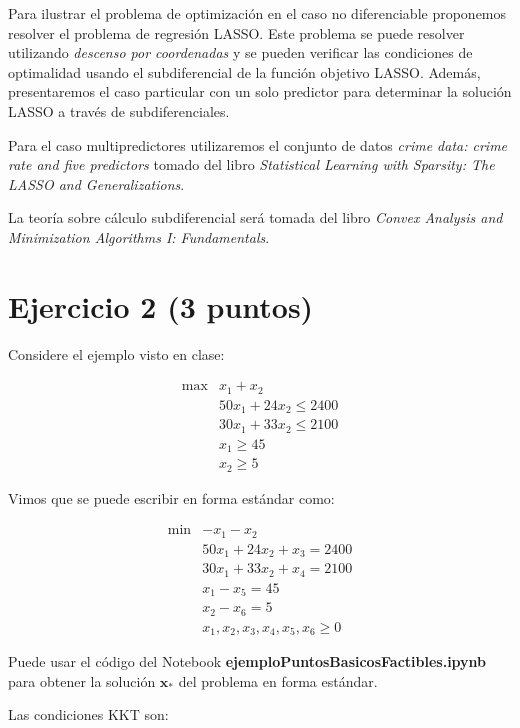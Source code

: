 \documentclass[11pt]{article}
\begin{document}
Para ilustrar el problema de optimización en el caso no diferenciable
proponemos resolver el problema de regresión LASSO. Este problema se
puede resolver utilizando \emph{descenso por coordenadas} y se pueden
verificar las condiciones de optimalidad usando el subdiferencial de la
función objetivo LASSO. Además, presentaremos el caso particular con un
solo predictor para determinar la solución LASSO a través de
subdiferenciales.

Para el caso multipredictores utilizaremos el conjunto de datos
\emph{crime data: crime rate and five predictors} tomado del libro
\emph{Statistical Learning with Sparsity: The LASSO and
Generalizations}.

La teoría sobre cálculo subdiferencial será tomada del libro
\emph{Convex Analysis and Minimization Algorithms I: Fundamentals}.

    \hypertarget{ejercicio-2-3-puntos}{%
\section{Ejercicio 2 (3 puntos)}\label{ejercicio-2-3-puntos}}

Considere el ejemplo visto en clase:

\[
\begin{array}{rl}
\max & x_1 + x_2\\
     & 50x_1 + 24x_2 \leq 2400 \\
     & 30x_1 + 33x_2 \leq 2100 \\
     & x_1 \geq 45 \\
     & x_2 \geq 5
\end{array}
\]

Vimos que se puede escribir en forma estándar como:

\[
\begin{array}{rl}
\min & -x_1 - x_2\\
     & 50x_1 + 24x_2 + x_3 =  2400 \\
     & 30x_1 + 33x_2 + x_4 =  2100 \\
     & x_1 - x_5 = 45 \\
     & x_2 - x_6 =  5 \\
     & x_1, x_2, x_3, x_4, x_5, x_6 \geq 0
\end{array}
\]

Puede usar el código del Notebook
\textbf{ejemploPuntosBasicosFactibles.ipynb} para obtener la solución
\(\mathbf{x}_*\) del problema en forma estándar.

Las condiciones KKT son:
\end{document}
